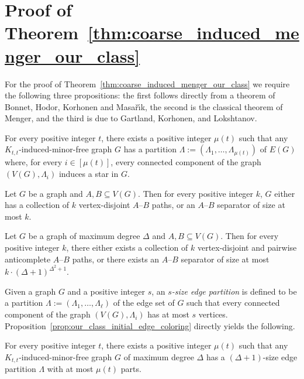 \section{Proof of  Theorem~\ref{thm:coarse_induced_menger_our_class}}
For the proof of Theorem~\ref{thm:coarse_induced_menger_our_class} we require the following three propositions: the first follows directly from a theorem of Bonnet, Hodor, Korhonen and Masa{\v{r}}{\'\i}k, the second is the classical theorem of Menger, and the third is due to Gartland, Korhonen, and Lokshtanov.

\begin{proposition}\label{prop:our_class_initial_edge_coloring}
     For every positive integer $t$, there exists a positive integer $\mu(t)$ such that any $K_{t,t}$-induced-minor-free graph $G$ has a partition $\Lambda := (\Lambda_1,\dots, \Lambda_{\mu(t)})$ of $E(G)$ where, for every $i\in [\mu(t)]$, every connected component of the graph $(V(G), \Lambda_i)$ induces a star in $G$.
\end{proposition}

\begin{proposition}\label{prop:mengers_theorem}
    Let $G$ be a graph and $A,B \subseteq V(G)$. Then for every positive integer $k$, $G$ either has a collection of $k$ vertex-disjoint $A$--$B$ paths, or an $A$--$B$ separator of size at most $k$.
\end{proposition}

\begin{proposition}\label{prop:sparse_induced_menger}
    Let $G$ be a graph of maximum degree $\Delta$ and $A, B \subseteq V (G)$. Then for every positive integer $k$, there either exists a collection of $k$ vertex-disjoint and pairwise anticomplete $A$--$B$ paths, or there exists an $A$--$B$ separator of size at most $k \cdot (\Delta + 1)^{\Delta^2+1}$.
\end{proposition}

Given a graph $G$ and a positive integer $s$, an \emph{$s$-size edge partition} is defined to be a partition $\Lambda := (\Lambda_1,\dots, \Lambda_{\ell})$ of the edge set of $G$ such that every connected component of the graph $(V(G), \Lambda_i)$ has at most $s$ vertices. Proposition~\ref{prop:our_class_initial_edge_coloring} directly yields the following.

\begin{proposition}\label{prop:our_class_edge_coloring}
     For every positive integer $t$, there exists a positive integer $\mu(t)$ such that any $K_{t,t}$-induced-minor-free graph $G$ of maximum degree $\Delta$ has a $(\Delta+1)$-size edge partition $\Lambda$ with at most $\mu(t)$ parts.
\end{proposition}

